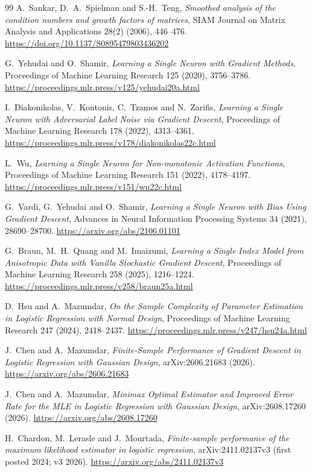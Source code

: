 \documentclass[11pt]{article}
\begin{document}
\begin{thebibliography}{99}
A.~Sankar, D.~A.~Spielman and S.-H.~Teng,
\emph{Smoothed analysis of the condition numbers and growth factors of matrices},
SIAM Journal on Matrix Analysis and Applications 28(2) (2006), 446--476.
\url{https://doi.org/10.1137/S0895479803436202}

G.~Yehudai and O.~Shamir,
\emph{Learning a Single Neuron with Gradient Methods},
Proceedings of Machine Learning Research 125 (2020), 3756--3786.
\url{https://proceedings.mlr.press/v125/yehudai20a.html}

I.~Diakonikolas, V.~Kontonis, C.~Tzamos and N.~Zarifis,
\emph{Learning a Single Neuron with Adversarial Label Noise via Gradient Descent},
Proceedings of Machine Learning Research 178 (2022), 4313--4361.
\url{https://proceedings.mlr.press/v178/diakonikolas22c.html}

L.~Wu,
\emph{Learning a Single Neuron for Non-monotonic Activation Functions},
Proceedings of Machine Learning Research 151 (2022), 4178--4197.
\url{https://proceedings.mlr.press/v151/wu22c.html}

G.~Vardi, G.~Yehudai and O.~Shamir,
\emph{Learning a Single Neuron with Bias Using Gradient Descent},
Advances in Neural Information Processing Systems 34 (2021), 28690--28700.
\url{https://arxiv.org/abs/2106.01101}

G.~Braun, M.~H.~Quang and M.~Imaizumi,
\emph{Learning a Single Index Model from Anisotropic Data with Vanilla Stochastic Gradient Descent},
Proceedings of Machine Learning Research 258 (2025), 1216--1224.
\url{https://proceedings.mlr.press/v258/braun25a.html}

D.~Hsu and A.~Mazumdar,
\emph{On the Sample Complexity of Parameter Estimation in Logistic Regression with Normal Design},
Proceedings of Machine Learning Research 247 (2024), 2418--2437.
\url{https://proceedings.mlr.press/v247/hsu24a.html}

J.~Chen and A.~Mazumdar,
\emph{Finite-Sample Performance of Gradient Descent in Logistic Regression with Gaussian Design},
arXiv:2606.21683 (2026).
\url{https://arxiv.org/abs/2606.21683}

J.~Chen and A.~Mazumdar,
\emph{Minimax Optimal Estimator and Improved Error Rate for the MLE in Logistic Regression with Gaussian Design},
arXiv:2608.17260 (2026).
\url{https://arxiv.org/abs/2608.17260}

H.~Chardon, M.~Lerasle and J.~Mourtada,
\emph{Finite-sample performance of the maximum likelihood estimator in logistic regression},
arXiv:2411.02137v3 (first posted 2024; v3 2026).
\url{https://arxiv.org/abs/2411.02137v3}


\end{thebibliography}
\end{document}
